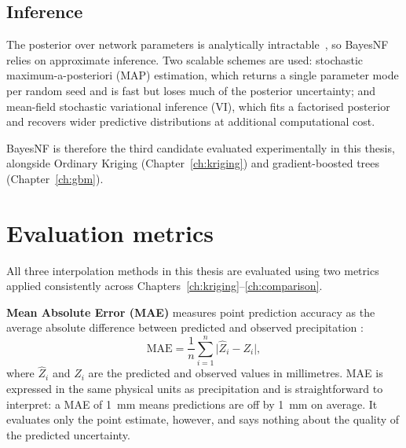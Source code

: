 \subsection{Inference}
\label{sec:theory-bayesnf-inference}

\begin{sloppypar}
The posterior over network parameters is analytically
intractable~\cite{saad2024bnf}, so BayesNF relies on approximate inference.
Two scalable schemes are used: stochastic maximum-a-posteriori (MAP)
estimation, which returns a single parameter mode per random seed and is
fast but loses much of the posterior uncertainty; and mean-field
stochastic variational inference (VI), which fits a factorised
posterior and recovers wider predictive distributions at additional
computational cost.
\end{sloppypar}

\medskip\noindent
BayesNF is therefore the third candidate evaluated experimentally in
this thesis, alongside Ordinary Kriging (Chapter~\ref{ch:kriging}) and
gradient-boosted trees (Chapter~\ref{ch:gbm}).

\section{Evaluation metrics}
\label{sec:theory-metrics}
\label{sec:theory-crps}

All three interpolation methods in this thesis are evaluated using two metrics
applied consistently across Chapters~\ref{ch:kriging}--\ref{ch:comparison}.

\textbf{Mean Absolute Error (MAE)} measures point prediction accuracy as the
average absolute difference between predicted and observed precipitation
\cite{willmott2005mae}:
\begin{equation}
  \mathrm{MAE} = \frac{1}{n}\sum_{i=1}^{n}\bigl|\hat{Z}_i - Z_i\bigr|,
  \label{eq:mae}
\end{equation}
where $\hat{Z}_i$ and $Z_i$ are the predicted and observed values in
millimetres. MAE is expressed in the same physical units as precipitation and
is straightforward to interpret: a MAE of 1~mm means predictions are off by
1~mm on average. It evaluates only the point estimate, however, and says
nothing about the quality of the predicted uncertainty.

